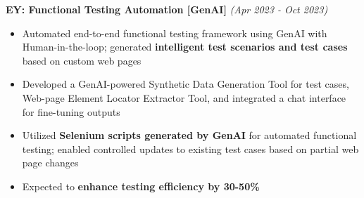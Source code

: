 \documentclass[a4paper,10pt]{article}
\newcommand{\isep}{-2 pt}
\begin{document}
\begin{itemize}
{{\item \textbf{EY: Functional Testing Automation [GenAI]}  \hfill {\emph{(Apr 2023 - Oct 2023)}}
    \\[-0.6cm]
    \begin{itemize}\itemsep \isep
        \item Automated end-to-end functional testing framework using GenAI with Human-in-the-loop; generated \textbf{intelligent test scenarios and test cases} based on custom web pages
        \item Developed a GenAI-powered Synthetic Data Generation Tool for test cases, Web-page Element Locator Extractor Tool, and integrated a chat interface for fine-tuning outputs
        \item Utilized \textbf{Selenium scripts generated by GenAI} for automated functional testing; enabled controlled updates to existing test cases based on partial web page changes
        \item Expected to \textbf{enhance testing efficiency by 30-50\%}
    
    

\end{itemize}}}
\end{itemize}
\end{document}
